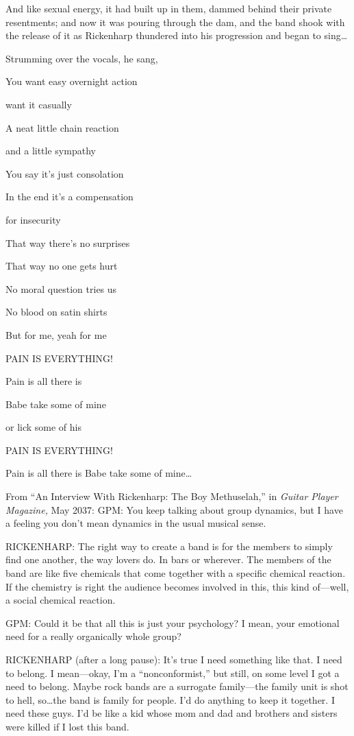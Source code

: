 And like sexual energy, it had built up in them, dammed behind their private resentments; and now it was pouring through the dam, and the band shook with the release of it as Rickenharp thundered into his progression and began to sing\ldots

Strumming over the vocals, he sang,

You want easy overnight action

want it casually

A neat little chain reaction

and a little sympathy

You say it's just consolation

In the end it's a compensation

for insecurity

That way there's no surprises

That way no one gets hurt

No moral question tries us

No blood on satin shirts

But for me, yeah for me

PAIN IS EVERYTHING!

Pain is all there is

Babe take some of mine

or lick some of his

PAIN IS EVERYTHING!

Pain is all there is Babe take some of mine\ldots

From ``An Interview With Rickenharp: The Boy Methuselah,'' in \textit{Guitar Player Magazine,} May 2037: GPM: You keep talking about group dynamics, but I have a feeling you don't mean dynamics in the usual musical sense.

RICKENHARP: The right way to create a band is for the members to simply find one another, the way lovers do. In bars or wherever. The members of the band are like five chemicals that come together with a specific chemical reaction. If the chemistry is right the audience becomes involved in this, this kind of---well, a social chemical reaction.

GPM: Could it be that all this is just your psychology? I mean, your emotional need for a really organically whole group?

RICKENHARP (after a long pause): It's true I need something like that. I need to belong. I mean---okay, I'm a ``nonconformist,'' but still, on some level I got a need to belong. Maybe rock bands are a surrogate family---the family unit is shot to hell, so\ldots the band is family for people. I'd do anything to keep it together. I need these guys. I'd be like a kid whose mom and dad and brothers and sisters were killed if I lost this band.

